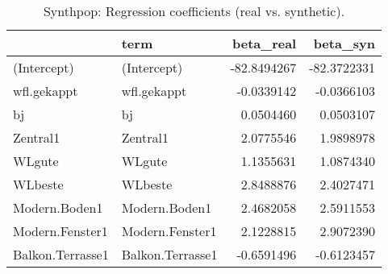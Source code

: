 \begin{table}

\caption{\label{tab:tab:synthpop:coef}Synthpop: Regression coefficients (real vs. synthetic).}
\centering
\begin{tabular}[t]{llrr}
\toprule
  & term & beta\_real & beta\_syn\\
\midrule
(Intercept) & (Intercept) & -82.8494267 & -82.3722331\\
wfl.gekappt & wfl.gekappt & -0.0339142 & -0.0366103\\
bj & bj & 0.0504460 & 0.0503107\\
Zentral1 & Zentral1 & 2.0775546 & 1.9898978\\
WLgute & WLgute & 1.1355631 & 1.0874340\\
\addlinespace
WLbeste & WLbeste & 2.8488876 & 2.4027471\\
Modern.Boden1 & Modern.Boden1 & 2.4682058 & 2.5911553\\
Modern.Fenster1 & Modern.Fenster1 & 2.1228815 & 2.9072390\\
Balkon.Terrasse1 & Balkon.Terrasse1 & -0.6591496 & -0.6123457\\
\bottomrule
\end{tabular}
\end{table}